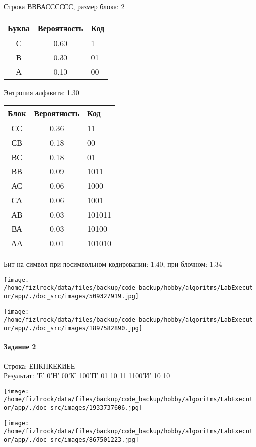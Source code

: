 \documentclass[a4paper, 12pt]{article}
\begin{document}
Строка ВВВАСССССС, размер блока: 2
\begin{center}
 \begin{tabular}{ |c|c|l| } 
  \hline
     Буква & Вероятность & Код\\ \hline
С & 0.60 & 1\\\hline
В & 0.30 & 01\\\hline
А & 0.10 & 00
\\ \hline \end{tabular}
\end{center}
Энтропия алфавита: 1.30
\begin{center}
 \begin{tabular}{ |c|c|l| } 
  \hline
     Блок & Вероятность & Код\\ \hline
СС & 0.36 & 11\\\hline
СВ & 0.18 & 00\\\hline
ВС & 0.18 & 01\\\hline
ВВ & 0.09 & 1011\\\hline
АС & 0.06 & 1000\\\hline
СА & 0.06 & 1001\\\hline
АВ & 0.03 & 101011\\\hline
ВА & 0.03 & 10100\\\hline
АА & 0.01 & 101010
\\ \hline \end{tabular}
\end{center}
Бит на символ при посимвольном кодировании: 1.40, при блочном: 1.34

\texttt{[image: /home/fizlrock/data/files/backup/code\_backup/hobby/algoritms/LabExecutor/app/./doc\_src/images/509327919.jpg]}

\texttt{[image: /home/fizlrock/data/files/backup/code\_backup/hobby/algoritms/LabExecutor/app/./doc\_src/images/1897582890.jpg]}
\pagebreak
\paragraph{Задание 2}

Строка: 
ЕНКПКЕКИЕЕ\\
Результат: 'Е' 0'Н' 00'К' 100'П' 01 10 11 1100'И' 10 10

\texttt{[image: /home/fizlrock/data/files/backup/code\_backup/hobby/algoritms/LabExecutor/app/./doc\_src/images/1933737606.jpg]}

\texttt{[image: /home/fizlrock/data/files/backup/code\_backup/hobby/algoritms/LabExecutor/app/./doc\_src/images/867501223.jpg]}
\end{document}

